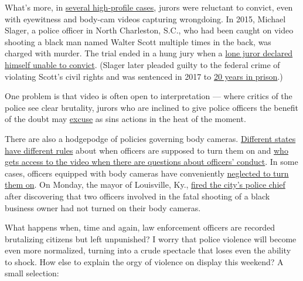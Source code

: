 What's more, in
\href{https://www.vox.com/policy-and-politics/2017/7/21/15983842/police-body-cameras-failures}{several
high-profile cases}, jurors were reluctant to convict, even with
eyewitness and body-cam videos capturing wrongdoing. In 2015, Michael
Slager, a police officer in North Charleston, S.C., who had been caught
on video shooting a black man named Walter Scott multiple times in the
back, was charged with murder. The trial ended in a hung jury when a
\href{https://www.nbcnews.com/news/crime-courts/jury-says-it-s-deadlocked-trial-officer-who-shot-walter-n691291}{lone
juror declared himself unable to convict}. (Slager later pleaded guilty
to the federal crime of violating Scott's civil rights and was sentenced
in 2017 to
\href{https://www.nytimes.com/2017/12/07/us/michael-slager-sentence-walter-scott.html}{20
years in prison}.)

One problem is that video is often open to interpretation --- where
critics of the police see clear brutality, jurors who are inclined to
give police officers the benefit of the doubt may
\href{https://www.cnn.com/2017/06/16/us/philando-castile-trial-verdict/index.html}{excuse}
as sins actions in the heat of the moment.

There are also a hodgepodge of policies governing body cameras.
\href{https://www.brennancenter.org/our-work/research-reports/police-body-worn-camera-policies}{Different
states have different rules} about when officers are supposed to turn
them on and
\href{https://www.abc10.com/article/news/local/release-of-police-body-cam-video-policies-varies-between-agencies/103-530783929}{who
gets access to the video when there are questions about officers'
conduct}. In some cases, officers equipped with body cameras have
conveniently
\href{https://www.vox.com/policy-and-politics/2017/7/17/15985442/minneapolis-police-shooting-justine-damond-video}{neglected
to turn them on}. On Monday, the mayor of Louisville, Ky.,
\href{https://www.cbsnews.com/news/steve-conrad-louisville-police-chief-fired-protest-shooting-death/}{fired
the city's police chief} after discovering that two officers involved in
the fatal shooting of a black business owner had not turned on their
body cameras.

What happens when, time and again, law enforcement officers are recorded
brutalizing citizens but left unpunished? I worry that police violence
will become even more normalized, turning into a crude spectacle that
loses even the ability to shock. How else to explain the orgy of
violence on display this weekend? A small selection:

